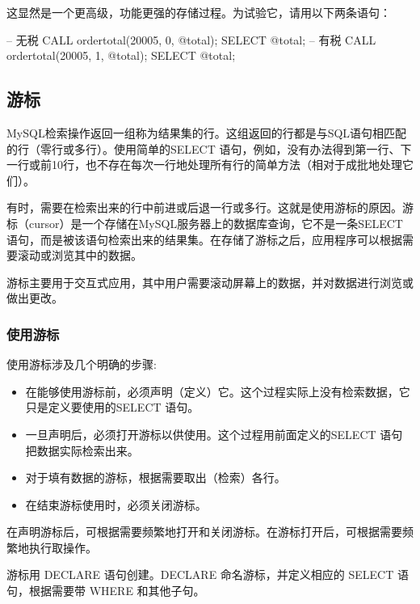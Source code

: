这显然是一个更高级，功能更强的存储过程。为试验它，请用以下两条语句：

\begin{sql}
-- 无税
CALL ordertotal(20005, 0, @total);
SELECT @total;
-- 有税
CALL ordertotal(20005, 1, @total);
SELECT @total;
\end{sql}

\subsection{游标}

MySQL检索操作返回一组称为结果集的行。这组返回的行都是与SQL语句相匹配的行（零行或多行）。使用简单的SELECT 语句，例如，没有办法得到第一行、下一行或前10行，也不存在每次一行地处理所有行的简单方法（相对于成批地处理它们）。

有时，需要在检索出来的行中前进或后退一行或多行。这就是使用游标的原因。游标（cursor）是一个存储在MySQL服务器上的数据库查询，它不是一条SELECT 语句，而是被该语句检索出来的结果集。在存储了游标之后，应用程序可以根据需要滚动或浏览其中的数据。

游标主要用于交互式应用，其中用户需要滚动屏幕上的数据，并对数据进行浏览或做出更改。


\subsubsection{使用游标}

使用游标涉及几个明确的步骤:
\begin{itemize}
    \item 在能够使用游标前，必须声明（定义）它。这个过程实际上没有检索数据，它只是定义要使用的SELECT 语句。
    \item 一旦声明后，必须打开游标以供使用。这个过程用前面定义的SELECT 语句把数据实际检索出来。
    \item 对于填有数据的游标，根据需要取出（检索）各行。
    \item 在结束游标使用时，必须关闭游标。
\end{itemize}

在声明游标后，可根据需要频繁地打开和关闭游标。在游标打开后，可根据需要频繁地执行取操作。

游标用 DECLARE 语句创建。DECLARE 命名游标，并定义相应的 SELECT 语句，根据需要带 WHERE 和其他子句。

